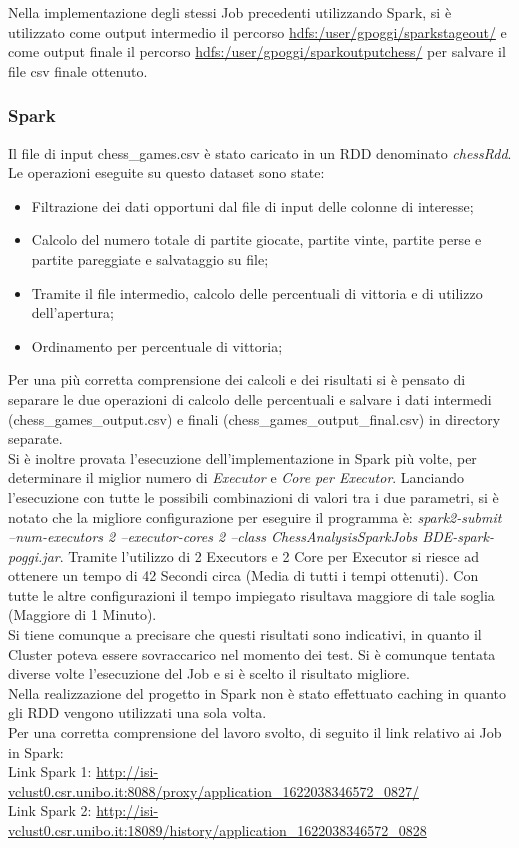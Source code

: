 \documentclass[10pt]{article}
\begin{document}
Nella implementazione degli stessi Job precedenti utilizzando Spark, si \`e utilizzato come output intermedio il percorso \url{hdfs:/user/gpoggi/sparkstageout/} e come output finale il percorso \url{hdfs:/user/gpoggi/sparkoutputchess/} per salvare il file csv finale ottenuto.

\subsubsection{Spark}

Il file di input chess\_games.csv \`e stato caricato in un RDD denominato \textit{chessRdd}. Le operazioni eseguite su questo dataset sono state:
\begin{itemize}
    \item Filtrazione dei dati opportuni dal file di input delle colonne di interesse;
    \item Calcolo del numero totale di partite giocate, partite vinte, partite perse e partite pareggiate e salvataggio su file;
    \item Tramite il file intermedio, calcolo delle percentuali di vittoria e di utilizzo dell'apertura;
    \item Ordinamento per percentuale di vittoria;
\end{itemize}
Per una pi\`u corretta comprensione dei calcoli e dei risultati si \`e pensato di separare le due operazioni di calcolo delle percentuali e salvare i dati intermedi (chess\_games\_output.csv) e finali (chess\_games\_output\_final.csv) in directory separate.\\
Si \`e inoltre provata l'esecuzione dell'implementazione in Spark pi\`u volte, per determinare il miglior numero di \textit{Executor} e \textit{Core per Executor}. Lanciando l'esecuzione con tutte le possibili combinazioni di valori tra i due parametri, si \`e notato che la migliore configurazione per eseguire il programma \`e: \textit{spark2-submit --num-executors 2 --executor-cores 2 --class ChessAnalysisSparkJobs BDE-spark-poggi.jar}. Tramite l'utilizzo di 2 Executors e 2 Core per Executor si riesce ad ottenere un tempo di 42 Secondi circa (Media di tutti i tempi ottenuti). Con tutte le altre configurazioni il tempo impiegato risultava maggiore di tale soglia (Maggiore di 1 Minuto).\\
Si tiene comunque a precisare che questi risultati sono indicativi, in quanto il Cluster poteva essere sovraccarico nel momento dei test. Si \`e comunque tentata diverse volte l'esecuzione del Job e si \`e scelto il risultato migliore.\\
Nella realizzazione del progetto in Spark non \`e stato effettuato caching in quanto gli RDD vengono utilizzati una sola volta.\\
Per una corretta comprensione del lavoro svolto, di seguito il link relativo ai Job in Spark:\\
Link Spark 1: \url{http://isi-vclust0.csr.unibo.it:8088/proxy/application_1622038346572_0827/}\\
Link Spark 2: \url{http://isi-vclust0.csr.unibo.it:18089/history/application_1622038346572_0828}
\end{document}
